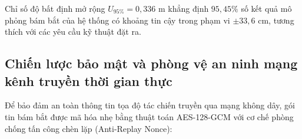 \begin{table}[H]
\centering
\caption{Bảng tổng hợp ngân sách độ bất định mở rộng chuẩn quốc tế GUM cho trạm đo bám bắt}
\label{tab:gum-uncertainty-budget-preliminary}
\end{table}

Chỉ số độ bất định mở rộng $U_{95\%} = 0{,}336$ m khẳng định $95{,}45\%$ số kết quả mô phỏng bám bắt của hệ thống có khoảng tin cậy trong phạm vi $\pm 33{,}6$ cm, tương thích với các yêu cầu kỹ thuật đặt ra.

\subsection{Chiến lược bảo mật và phòng vệ an ninh mạng kênh truyền thời gian thực}

\hspace{0.5cm} Để bảo đảm an toàn thông tin tọa độ tác chiến truyền qua mạng không dây, gói tin bám bắt được mã hóa nhẹ bằng thuật toán AES-128-GCM với cơ chế phòng chống tấn công chèn lặp (Anti-Replay Nonce):

